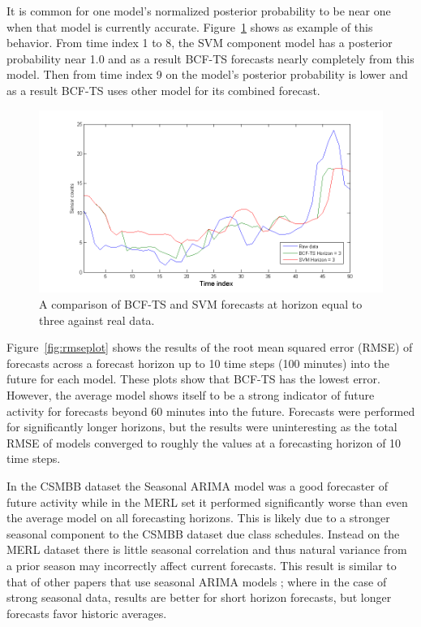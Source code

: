 \documentclass{acm_proc_article-sp}
\begin{document}
It is common for one model's normalized posterior probability to be near one when that model is currently accurate.  Figure~\ref{fig:realbcfsvm} shows as example of this behavior.  From time index 1 to 8, the SVM component model has a posterior probability near 1.0 and as a result BCF-TS forecasts nearly completely from this model.  Then from time index 9 on the model's posterior probability is lower and as a result BCF-TS uses other model for its combined forecast.

\begin{figure}[h]
\centering
\includegraphics[width = 1.0\linewidth]{real_forecasts_bcf_svm.png}
\caption{A comparison of BCF-TS and SVM forecasts at horizon equal to three against real data.}
\label{fig:realbcfsvm}
\end{figure}

Figure~\ref{fig:rmseplot} shows the results of the root mean squared error (RMSE) of forecasts across a forecast horizon up to 10 time steps (100 minutes) into the future for each model.  These plots show that BCF-TS has the lowest error.  However, the average model shows itself to be a strong indicator of future activity for forecasts beyond 60 minutes into the future.  Forecasts were performed for significantly longer horizons, but the results were uninteresting as the total RMSE of models converged to roughly the values at a forecasting horizon of 10 time steps.  

In the CSMBB dataset the Seasonal ARIMA model was a good forecaster of future activity while in the MERL set it performed significantly worse than even the average model on all forecasting horizons.  This is likely due to a stronger seasonal component to the CSMBB dataset due class schedules.  Instead on the MERL dataset there is little seasonal correlation and thus natural variance from a prior season may incorrectly affect current forecasts.  This result is similar to that of other papers that use seasonal ARIMA models \cite{Newsham2010}; where in the case of strong seasonal data, results are better for short horizon forecasts, but longer forecasts favor historic averages.
\end{document}
